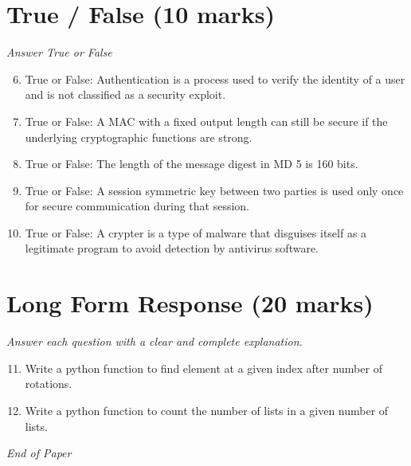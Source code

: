 \documentclass[12pt]{article}
\begin{document}
\section*{True / False (10 marks)}
\textit{Answer True or False}
\begin{enumerate}[label=\arabic*.]
\setcounter{enumi}{5}
\item True or False: Authentication is a process used to verify the identity of a user and is not classified as a security exploit.
\item True or False: A MAC with a fixed output length can still be secure if the underlying cryptographic functions are strong.
\item True or False: The length of the message digest in MD 5 is 160 bits.
\item True or False: A session symmetric key between two parties is used only once for secure communication during that session.
\item True or False: A crypter is a type of malware that disguises itself as a legitimate program to avoid detection by antivirus software.
\end{enumerate}

\section*{Long Form Response (20 marks)}
\textit{Answer each question with a clear and complete explanation.}
\begin{enumerate}[label=\arabic*.]
\setcounter{enumi}{10}
\item Write a python function to find element at a given index after number of rotations.
\item Write a python function to count the number of lists in a given number of lists.
\end{enumerate}

\vfill
\noindent\textit{End of Paper}
\end{document}
